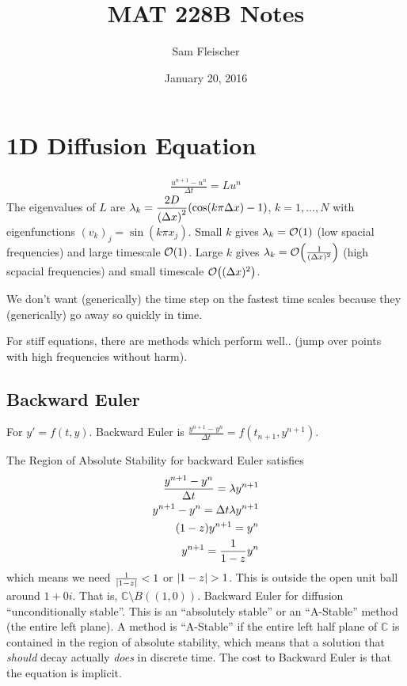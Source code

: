 \documentclass{article}
\title{MAT 228B Notes}
\author{Sam Fleischer}
\date{January 20, 2016}
\newcommand{\Cx}{\mathbb{C}}
\newcommand{\Dx}{\Delta x}
\newcommand{\Dt}{\Delta t}
\begin{document}
    \maketitle

    \section{1D Diffusion Equation}

        \begin{align}
            \frac{u^{n+1} - u^n}{\Dt} = Lu^n
        \end{align}
        The eigenvalues of $L$ are $\lambda_k = \dfrac{2D}{\qty(\Dx)^2}\qty(\cos(k\pi\Dx) - 1)$,  $k = 1,\dots,N$ with eigenfunctions $(v_k)_j = \sin(k\pi x_j)$.  Small $k$ gives $\lambda_k = \order{1}$ (low spacial frequencies) and large timescale $\order{1}$.  Large $k$ gives $\lambda_k = \order{\frac{1}{(\Dx)^2}}$ (high scpacial frequencies) and small timescale $\order{(\Dx)^2}$.

        We don't want (generically) the time step on the fastest time scales because they (generically) go away so quickly in time.

        For stiff equations, there are methods which perform well.. (jump over points with high frequencies without harm).

        \subsection{Backward Euler}

            For $y' = f(t,y)$.  Backward Euler is $\frac{y^{n+1} - y^n}{\Dt} = f(t_{n+1}, y^{n+1})$.

            The Region of Absolute Stability for backward Euler satisfies
            \begin{align}
                \frac{y^{n+1} - y^n}{\Dt} = \lambda y^{n+1} \\
                y^{n+1} - y^n = \Dt\lambda y^{n+1} \\
                \qty(1 - z)y^{n+1} = y^n \\
                y^{n+1} = \frac{1}{1 - z}y^n
            \end{align}
            which means we need $\frac{1}{\abs{1 - z}} < 1$ or $\abs{1 - z}> 1$.  This is outside the open unit ball around $1 + 0i$.  That is, $\Cx\setminus B((1,0))$.  Backward Euler for diffusion ``unconditionally stable''.  This is an ``absolutely stable'' or an ``A-Stable'' method (the entire left plane).  A method is ``A-Stable'' if the entire left half plane of $\Cx$ is contained in the region of absolute stability, which means that a solution that \emph{should} decay actually \emph{does} in discrete time.  The cost to Backward Euler is that the equation is implicit.
\end{document}
